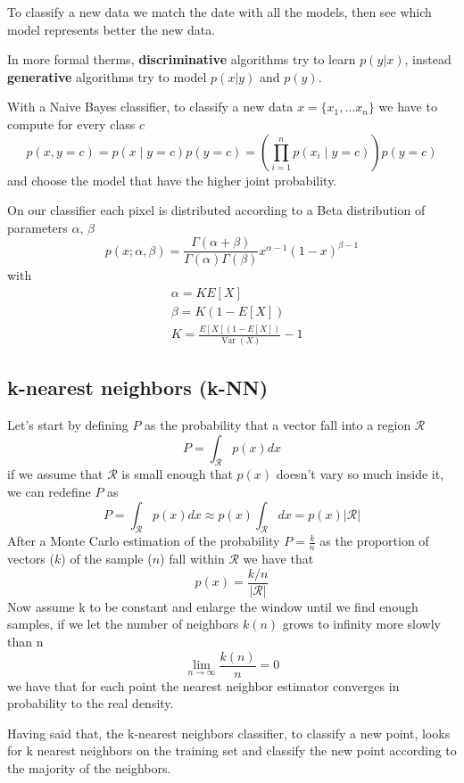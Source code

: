 \documentclass[12pt]{article}
\begin{document}
To classify a new data we match the date with all the models, then see which model 
represents better the new data.

In more formal therms, \textbf{discriminative} algorithms try to learn $p(y|x)$, 
instead \textbf{generative} algorithms try to model $p(x|y)$ and $p(y)$.

With a Naive Bayes classifier, to classify a new data $x = \{x_1,\dots x_n\}$ we have 
to compute for every class $c$
$$
p(x, y=c)=p(x \mid y=c) p(y=c)=\left(\prod_{i=1}^{n} p\left(x_i \mid y=c\right)\right) p(y=c)
$$
and choose the model that have the higher joint probability.

On our classifier each pixel is distributed according to a Beta distribution of 
parameters $\alpha$, $\beta$
$$
p(x ; \alpha, \beta)=\frac{\Gamma(\alpha+\beta)}{\Gamma(\alpha) \Gamma(\beta)} x^{\alpha-1}(1-x)^{\beta-1}
$$
with
$$
\begin{aligned}
& \alpha=K E[X] \\
& \beta=K(1-E[X]) \\
& K=\frac{E[X](1-E[X])}{\operatorname{Var}(X)}-1
\end{aligned}
$$

\subsection{k-nearest neighbors (k-NN)}

Let's start by defining $P$ as the probability that a vector fall into a region $\mathcal{R}$
$$
    P=\int_{\mathcal{R}} p(x) d x
$$
if we assume that $\mathcal{R}$ is small enough that $p(x)$ doesn't vary so much inside it,
we can redefine $P$ as
$$
    P=\int_{\mathcal{R}} p(x) d x \approx p(x) \int_{\mathcal{R}} d x=p(x)|\mathcal{R}|
$$
After a Monte Carlo estimation of the probability $P = \frac{k}{n}$ as the proportion
of vectors ($k$) of the sample ($n$) fall within $\mathcal{R}$ we have that
$$
    p(x) = \frac{k/n}{|\mathcal{R}|}
$$
Now assume k to be constant and enlarge the window until we find enough samples, if
we let the number of neighbors $k(n)$  grows to infinity more slowly than n
$$
    \lim _{n \rightarrow \infty} \frac{k(n)}{n}=0
$$
we have that for each point the nearest neighbor estimator converges in
probability to the real density.

Having said that, the k-nearest neighbors classifier, to classify a new point, looks for
k nearest neighbors on the training set and classify the new point according to the 
majority of the neighbors.
\end{document}

